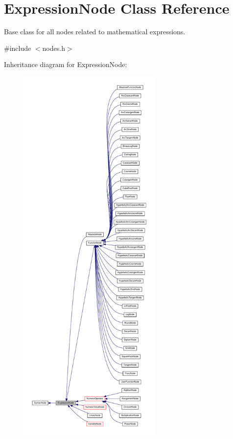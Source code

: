\hypertarget{classExpressionNode}{}\section{Expression\+Node Class Reference}
\label{classExpressionNode}


Base class for all nodes related to mathematical expressions.  




{\ttfamily \#include $<$nodes.\+h$>$}



Inheritance diagram for Expression\+Node\+:
\nopagebreak
\begin{figure}[H]
\begin{center}
\leavevmode
\includegraphics[height=550pt]{d4/d1c/classExpressionNode__inherit__graph}
\end{center}
\end{figure}


